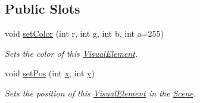 \subsection*{Public Slots}
\begin{DoxyCompactItemize}
\item 
void \hyperlink{struct_picto_1_1_visual_element_aaebee962be7f663acc78f2575f0cbcba}{set\-Color} (int r, int g, int b, int a=255)
\begin{DoxyCompactList}\small\item\em Sets the color of this \hyperlink{struct_picto_1_1_visual_element}{Visual\-Element}. \end{DoxyCompactList}\item 
void \hyperlink{struct_picto_1_1_visual_element_ab8d58316a0da7e9704298917d46ca900}{set\-Pos} (int \hyperlink{struct_picto_1_1_visual_element_a1b50bc5fa41868f661687015be3c97e8}{x}, int \hyperlink{struct_picto_1_1_visual_element_a9a4db3430219e1f78208eda1a89e9f38}{y})
\begin{DoxyCompactList}\small\item\em Sets the position of this \hyperlink{struct_picto_1_1_visual_element}{Visual\-Element} in the \hyperlink{class_picto_1_1_scene}{Scene}. \end{DoxyCompactList}\end{DoxyCompactItemize}
